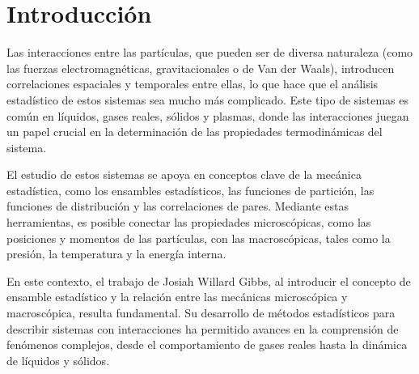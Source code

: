 \section{Introducción}
Las interacciones entre las partículas, que pueden ser de diversa naturaleza (como las fuerzas electromagnéticas, gravitacionales o de Van der Waals), introducen correlaciones espaciales y temporales entre ellas, lo que hace que el análisis estadístico de estos sistemas sea mucho más complicado. Este tipo de sistemas es común en líquidos, gases reales, sólidos y plasmas, donde las interacciones juegan un papel crucial en la determinación de las propiedades termodinámicas del sistema.

El estudio de estos sistemas se apoya en conceptos clave de la mecánica estadística, como los ensambles estadísticos, las funciones de partición, las funciones de distribución y las correlaciones de pares. Mediante estas herramientas, es posible conectar las propiedades microscópicas, como las posiciones y momentos de las partículas, con las macroscópicas, tales como la presión, la temperatura y la energía interna.

En este contexto, el trabajo de Josiah Willard Gibbs, al introducir el concepto de ensamble estadístico y la relación entre las mecánicas microscópica y macroscópica, resulta fundamental. Su desarrollo de métodos estadísticos para describir sistemas con interacciones ha permitido avances en la comprensión de fenómenos complejos, desde el comportamiento de gases reales hasta la dinámica de líquidos y sólidos.